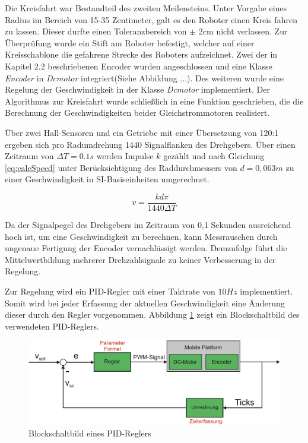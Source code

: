\documentclass[12pt,a4paper,oneside]{article}
\begin{document}
\begin{spacing}{1.15}
Die Kreisfahrt war Bestandteil des zweiten Meilensteins. Unter Vorgabe eines Radius im Bereich von 15-35 Zentimeter, galt es den Roboter einen Kreis fahren zu lassen. Dieser durfte einen Toleranzbereich von $\pm$ 2cm nicht verlassen. Zur Überprüfung wurde ein Stift am Roboter befestigt, welcher auf einer Kreisschablone die gefahrene Strecke des Roboters aufzeichnet. Zwei der in Kapitel 2.2 beschriebenen Encoder wurden angeschlossen und eine Klasse \textit{Encoder} in \textit{Dcmotor} integriert(Siehe Abbildung ...). Des weiteren wurde eine Regelung der Geschwindigkeit in der Klasse \textit{Dcmotor} implementiert. Der Algorithmus zur Kreisfahrt wurde schließlich in eine Funktion geschrieben, die die Berechnung der Geschwindigkeiten beider Gleichstrommotoren realisiert. 

Über zwei Hall-Sensoren und ein Getriebe mit einer Übersetzung von 120:1 \cite{Dem13} ergeben sich pro Radumdrehung 1440 Signalflanken des Drehgebers. Über einen Zeitraum von $\Delta T = 0.1s$ werden Impulse $k$ gezählt und nach Gleichung \ref{eq:calcSpeed} unter Berücksichtigung des Raddurchmessers von $d = 0,063m$ zu einer Geschwindigkeit in SI-Basiseinheiten umgerechnet.

\begin{center}
\begin{equation}
v = \frac{k d \pi}{1440\Delta T}
\label{eq:calcSpeed}
\end{equation}
\end{center} 

Da der Signalpegel des Drehgebers im Zeitraum von 0,1 Sekunden ausreichend hoch ist, um eine Geschwindigkeit zu berechnen, kann Messrauschen durch ungenaue Fertigung der Encoder vernachlässigt werden. Demzufolge führt die Mittelwertbildung mehrerer Drehzahlsignale zu keiner Verbesserung in der Regelung.

Zur Regelung wird ein PID-Regler mit einer Taktrate von $10Hz$ implementiert. Somit wird bei jeder Erfassung der aktuellen Geschwindigkeit eine Änderung dieser durch den Regler vorgenommen. Abbildung \ref{fig:PID_controller}  zeigt ein Blockschaltbild des verwendeten PID-Reglers. 

\begin{figure}[!htb]
	\centering
	\includegraphics[scale=.5]{figs/PID_controller}
	\caption{Blockschaltbild eines PID-Reglers}
	\label{fig:PID_controller}
\end{figure}


\end{spacing}
\end{document}
